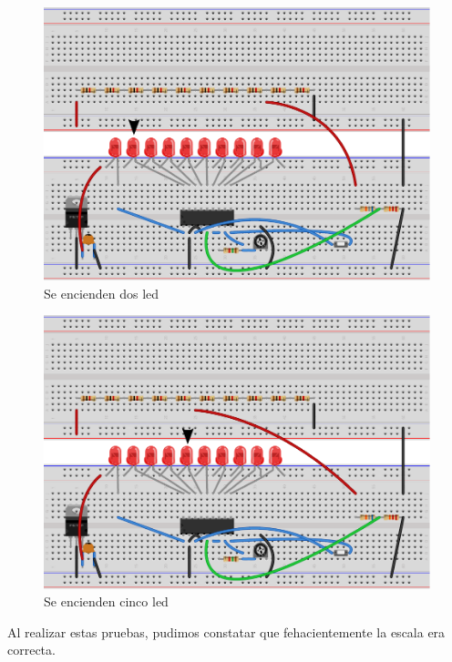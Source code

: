 \documentclass[12pt,a4paper]{article}
\begin{document}
			\begin{figure}[H]
			\centering
				\includegraphics[scale=0.9]{images/labo1_bb1.pdf}\caption{Se encienden dos led}
			\end{figure}

			\begin{figure}[H]
			\centering
				\includegraphics[scale=0.9]{images/labo1_bb.pdf}\caption{Se encienden cinco led}
			\end{figure}

			Al realizar estas pruebas, pudimos constatar que fehacientemente la escala era correcta.
\end{document}
